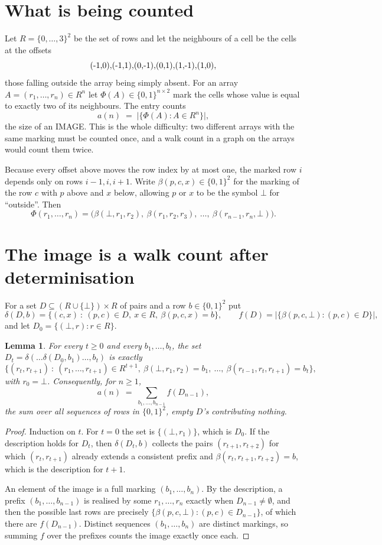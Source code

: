 \documentclass[11pt,a4paper]{article}
\theoremstyle{plain}
\newtheorem{lemma}[theorem]{Lemma}
\theoremstyle{definition}
\begin{document}
\section{What is being counted}

Let $R=\{0,\dots,3\}^{2}$ be the set of rows and let the neighbours of a cell be the
cells at the offsets
\[
$(-1,0)$, $(-1,1)$, $(0,-1)$, $(0,1)$, $(1,-1)$, $(1,0)$,
\]
those falling outside the array being simply absent. For an array
$A=(r_1,\dots,r_n)\in R^n$ let $\Phi(A)\in\{0,1\}^{n\times2}$ mark the cells whose value
is equal to exactly two of its neighbours. The entry counts
\[
a(n)\;=\;\bigl|\{\Phi(A):A\in R^n\}\bigr| ,
\]
the size of an IMAGE. This is the whole difficulty: two different arrays with the same marking
must be counted once, and a walk count in a graph on the arrays would count them twice.

Because every offset above moves the row index by at most one, the marked row $i$ depends only
on rows $i-1,i,i+1$. Write $\beta(p,c,x)\in\{0,1\}^{2}$ for the marking of the row $c$
with $p$ above and $x$ below, allowing $p$ or $x$ to be the symbol $\bot$ for ``outside''.
Then
\[
\Phi(r_1,\dots,r_n)=\bigl(\beta(\bot,r_1,r_2),\ \beta(r_1,r_2,r_3),\ \dots,\
\beta(r_{n-1},r_n,\bot)\bigr).
\]

\section{The image is a walk count after determinisation}

For a set $D\subseteq(R\cup\{\bot\})\times R$ of pairs and a row $b\in\{0,1\}^{2}$ put
\[
\delta(D,b)=\{(c,x)\ :\ (p,c)\in D,\ x\in R,\ \beta(p,c,x)=b\},\qquad
f(D)=\bigl|\{\beta(p,c,\bot):(p,c)\in D\}\bigr| ,
\]
and let $D_0=\{(\bot,r):r\in R\}$.

\begin{lemma}\label{lem:det}
For every $t\ge0$ and every $b_1,\dots,b_t$, the set
$D_t=\delta(\dots\delta(D_0,b_1)\dots,b_t)$ is exactly
\[
\{(r_t,r_{t+1})\ :\ (r_1,\dots,r_{t+1})\in R^{t+1},\ \beta(\bot,r_1,r_2)=b_1,\ \dots,\
\beta(r_{t-1},r_t,r_{t+1})=b_t\} ,
\]
with $r_0=\bot$. Consequently, for $n\ge1$,
\[
a(n)\;=\;\sum_{b_1,\dots,b_{n-1}}f(D_{n-1}),
\]
the sum over all sequences of rows in $\{0,1\}^{2}$, empty $D$'s contributing nothing.
\end{lemma}

\begin{proof}
Induction on $t$. For $t=0$ the set is $\{(\bot,r_1)\}$, which is $D_0$. If the description
holds for $D_t$, then $\delta(D_t,b)$ collects the pairs $(r_{t+1},r_{t+2})$ for which
$(r_t,r_{t+1})$ already extends a consistent prefix and
$\beta(r_t,r_{t+1},r_{t+2})=b$, which is the description for $t+1$.

An element of the image is a full marking $(b_1,\dots,b_n)$. By the description, a prefix
$(b_1,\dots,b_{n-1})$ is realised by some $r_1,\dots,r_n$ exactly when $D_{n-1}\neq
\emptyset$, and then the possible last rows are precisely
$\{\beta(p,c,\bot):(p,c)\in D_{n-1}\}$, of which there are $f(D_{n-1})$. Distinct
sequences $(b_1,\dots,b_n)$ are distinct markings, so summing $f$ over the prefixes counts the
image exactly once each.
\end{proof}
\end{document}
